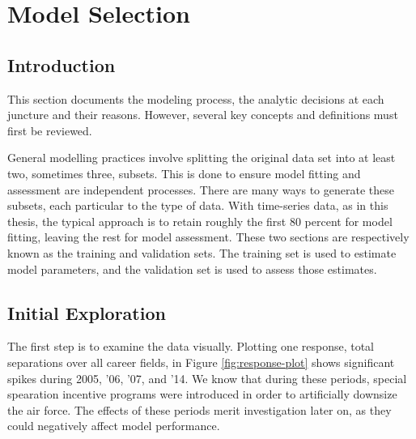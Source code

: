 \documentclass[12pt,letterpaper,toc=flat,oneside]{report}
\theoremstyle{definition}
\theoremstyle{definition}
\theoremstyle{definition}
\theoremstyle{remark}
\begin{document}
\hypertarget{model-selection}{%
\section{Model Selection}\label{model-selection}}

\hypertarget{introduction-2}{%
\subsection{Introduction}\label{introduction-2}}

This section documents the modeling process, the analytic decisions at
each juncture and their reasons. However, several key concepts and
definitions must first be reviewed.

General modelling practices involve splitting the original data set into
at least two, sometimes three, subsets. This is done to ensure model
fitting and assessment are independent processes. There are many ways to
generate these subsets, each particular to the type of data. With
time-series data, as in this thesis, the typical approach is to retain
roughly the first 80 percent for model fitting, leaving the rest for
model assessment. These two sections are respectively known as the
training and validation sets. The training set is used to estimate model
parameters, and the validation set is used to assess those estimates.

\hypertarget{initial-exploration}{%
\subsection{Initial Exploration}\label{initial-exploration}}

The first step is to examine the data visually. Plotting one response,
total separations over all career fields, in Figure
\ref{fig:response-plot} shows significant spikes during 2005, '06, '07,
and '14. We know that during these periods, special spearation incentive
programs were introduced in order to artificially downsize the air
force. The effects of these periods merit investigation later on, as
they could negatively affect model performance.
\end{document}

